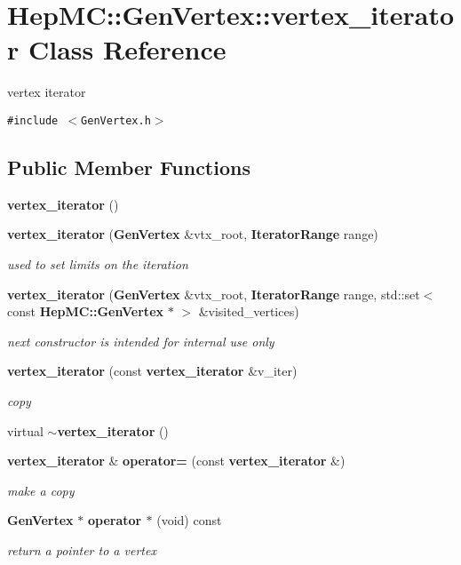\section{Hep\-MC::Gen\-Vertex::vertex\_\-iterator Class Reference}
\label{classHepMC_1_1GenVertex_1_1vertex__iterator}
vertex iterator  


{\tt \#include $<$Gen\-Vertex.h$>$}

\subsection*{Public Member Functions}
\begin{CompactItemize}
\item 
{\bf vertex\_\-iterator} ()
\item 
{\bf vertex\_\-iterator} ({\bf Gen\-Vertex} \&vtx\_\-root, {\bf Iterator\-Range} range)
\begin{CompactList}\small\item\em used to set limits on the iteration \item\end{CompactList}\item 
{\bf vertex\_\-iterator} ({\bf Gen\-Vertex} \&vtx\_\-root, {\bf Iterator\-Range} range, std::set$<$ const {\bf Hep\-MC::Gen\-Vertex} $\ast$ $>$ \&visited\_\-vertices)
\begin{CompactList}\small\item\em next constructor is intended for internal use only \item\end{CompactList}\item 
{\bf vertex\_\-iterator} (const {\bf vertex\_\-iterator} \&v\_\-iter)
\begin{CompactList}\small\item\em copy \item\end{CompactList}\item 
virtual {\bf $\sim$vertex\_\-iterator} ()
\item 
{\bf vertex\_\-iterator} \& {\bf operator=} (const {\bf vertex\_\-iterator} \&)
\begin{CompactList}\small\item\em make a copy \item\end{CompactList}\item 
{\bf Gen\-Vertex} $\ast$ {\bf operator $\ast$} (void) const
\begin{CompactList}\small\item\em return a pointer to a vertex \item\end{CompactList}\item 

\end{CompactItemize}
